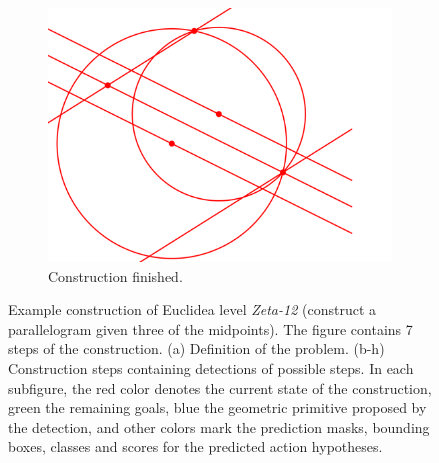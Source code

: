 \begin{figure}[htb!]
     \begin{subfigure}[t]{0.32\textwidth}
         \centering
         \includegraphics[width=\textwidth]{img/Zeta-06_example/input_image7.png}
         \caption{\small Construction finished.}
         \label{fig:Zeta06_example_finished}
     \end{subfigure}
     \hfill
        \caption{\small Example construction of Euclidea level \textit{Zeta-12} (construct a parallelogram given three of the midpoints).
        The figure contains 7 steps of the construction. (a) Definition of the problem. (b-h) Construction steps containing \maskrcnn detections of possible steps. In each subfigure, the red color denotes the current state of the construction, green the remaining goals, blue the geometric primitive proposed by the detection,
        and other
        colors mark the prediction masks, bounding boxes, classes and scores for the predicted action hypotheses.
        }
        \label{fig:Zeta06_example}
\end{figure}
